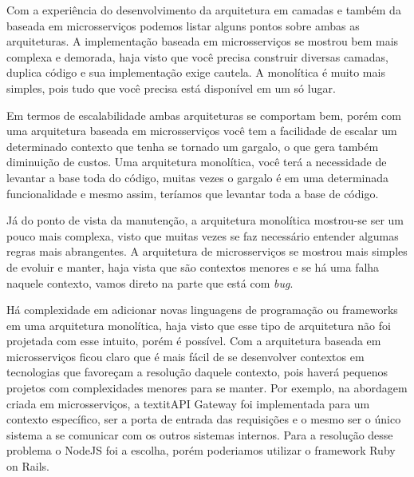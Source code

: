 Com a experiência do desenvolvimento da arquitetura em camadas e também da baseada em microsserviços podemos listar alguns pontos sobre ambas as arquiteturas.
A implementação baseada em microsserviços se mostrou bem mais complexa e demorada, haja visto que você precisa construir diversas camadas, duplica código e sua implementação exige cautela. A monolítica é muito mais simples, pois tudo que você precisa está disponível em um só lugar.

Em termos de escalabilidade ambas arquiteturas se comportam bem, porém com uma arquitetura baseada em microsserviços você tem a facilidade de escalar um determinado contexto que tenha se tornado um gargalo, o que gera também diminuição de custos. Uma arquitetura monolítica, você terá a necessidade de levantar a base toda do código, muitas vezes o gargalo é em uma determinada funcionalidade e mesmo assim, teríamos que levantar toda a base de código.

Já do ponto de vista da manutenção, a arquitetura monolítica mostrou-se ser um pouco mais complexa, visto que muitas vezes se faz necessário entender algumas regras mais abrangentes. A arquitetura de microsserviços se mostrou mais simples de evoluir e manter, haja vista que são contextos menores e se há uma falha naquele contexto, vamos direto na parte que está com \textit{bug}.


Há complexidade em adicionar novas linguagens de programação ou frameworks em uma arquitetura monolítica, haja visto que esse tipo de arquitetura não foi projetada com esse intuito, porém é possível. Com a arquitetura baseada em microsserviços ficou claro que é mais fácil de se desenvolver contextos em tecnologias que favoreçam a resolução daquele contexto, pois haverá pequenos projetos com complexidades menores para se manter. Por exemplo, na abordagem criada em microsserviços, a textit{API Gateway} foi implementada para um contexto específico, ser a porta de entrada das requisições e o mesmo ser o único sistema a se comunicar com os outros sistemas internos. Para a resolução desse problema o NodeJS foi a escolha, porém poderiamos utilizar o framework Ruby on Rails. 

